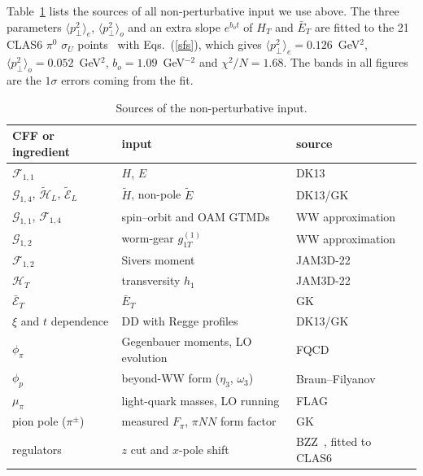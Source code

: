 \documentclass[aps,prd,showpacs,notitlepage,nofootinbib,preprintnumbers,amsmath,amssymb]{revtex4-2}
\begin{document}
Table~\ref{tab:inputs} lists the sources of all non-perturbative input we use above. The three parameters $\langle p_\perp^2\rangle_e$, $\langle p_\perp^2\rangle_o$ and an extra slope $e^{b_ot}$ of $H_T$ and $\bar E_T$ are fitted to the 21 CLAS6 $\pi^0$ $\sigma_U$ points~\cite{CLAS:2014jpc} with Eqs.~(\ref{sfs}), which gives $\langle p_\perp^2\rangle_e=0.126$~GeV$^2$, $\langle p_\perp^2\rangle_o=0.052$~GeV$^2$, $b_o=1.09$~GeV$^{-2}$ and $\chi^2/N=1.68$. The bands in all figures are the $1\sigma$ errors coming from the fit. 

\begin{table}[h]
\centering
\begin{tabular}{l l l}
\toprule
CFF or ingredient & input & source\\
\midrule
$\mathcal F_{1,1}$ & $H$, $E$ & DK13~\cite{Diehl:2013xca}\\
$\mathcal G_{1,4}$, $\tilde{\mathcal H}_L$, $\tilde{\mathcal E}_L$ & $\tilde H$, non-pole $\tilde E$ & DK13/GK~\cite{Diehl:2013xca,Goloskokov:2009ia}\\
$\mathcal G_{1,1}$, $\mathcal F_{1,4}$ & spin--orbit and OAM GTMDs & WW approximation~\cite{Hatta:2012cs}\\
$\mathcal G_{1,2}$ & worm-gear $g_{1T}^{(1)}$ & WW approximation\\
$\mathcal F_{1,2}$ & Sivers moment & JAM3D-22~\cite{Gamberg:2022kdb}\\
$\mathcal H_T$ & transversity $h_1$ & JAM3D-22~\cite{Gamberg:2022kdb}\\
$\bar{\mathcal E}_T$ & $\bar E_T$ & GK~\cite{Goloskokov:2011rd}\\
$\xi$ and $t$ dependence & DD with Regge profiles & DK13/GK~\cite{Diehl:2013xca,Goloskokov:2011rd}\\
$\phi_\pi$ & Gegenbauer moments, LO evolution & FQCD~\cite{FQCD-pionDA}\\
$\phi_p$ & beyond-WW form ($\eta_3$, $\omega_3$) & Braun--Filyanov~\cite{Braun:1989iv,Ball:2006wn}\\
$\mu_\pi$ & light-quark masses, LO running & FLAG~\cite{FlavourLatticeAveragingGroupFLAG:2024oxs}\\
pion pole ($\pi^\pm$) & measured $F_\pi$, $\pi NN$ form factor & GK~\cite{Goloskokov:2009ia,Goloskokov:2011rd}\\
regulators & $z$ cut and $x$-pole shift & BZZ~\cite{Bhattacharya:2023hbq}, fitted to CLAS6~\cite{CLAS:2014jpc}\\
\bottomrule
\end{tabular}
\caption{Sources of the non-perturbative input.}
\label{tab:inputs}
\end{table}
\end{document}
